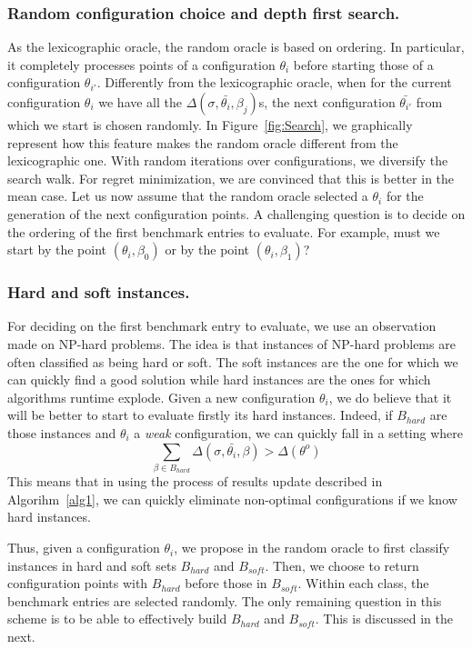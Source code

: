 \documentclass[10pt, conference, compsocconf]{IEEEtran}
\begin{document}
\subsubsection{ Random configuration choice and depth first search.} 
As the lexicographic  oracle, the random  oracle is based on ordering. In particular, it completely processes  
points of a configuration $\theta_{i}$ before starting those of a configuration $\theta_{i'}$.  
Differently from the lexicographic  oracle, when for the current configuration $\theta_i$ 
 we have all the $\Delta(\sigma, \bar{\theta_i}, \beta_j)$s, the next configuration $\bar{\theta_{i'}}$ from 
which we start is chosen randomly. In Figure~\ref{fig:Search}, we graphically represent  how this feature 
makes the random  oracle different from the lexicographic one. With random iterations over configurations, 
we diversify the search walk. For regret minimization, we are convinced that this is better in the mean case. 
Let us now assume that the random  oracle selected a  $\theta_i$ for the generation of the next configuration 
points. A challenging question is to decide on the ordering of the first benchmark entries to evaluate. 
For example, must we start by the point $(\theta_i, \beta_0)$ or by the point $(\theta_i, \beta_1)$?

\subsubsection{ Hard and soft instances.} 

For deciding on the first benchmark entry to evaluate, we use an observation made on NP-hard problems. 
The idea is that instances of NP-hard problems are often classified as being hard or soft. The soft instances are the 
one for which we can quickly find a good solution while hard instances are the ones for which algorithms runtime explode.
Given a new configuration $\theta_i$, we do believe that it will be better to start to evaluate firstly its 
hard instances. Indeed, if $B_{hard}$  are those instances and $\theta_i$ a {\it weak} configuration, 
we can quickly fall in a setting where \[ \sum_{\beta \in B_{hard}} \Delta(\sigma, \bar{\theta_i}, \beta) > \Delta(\theta^o)\]
This means that in using the process of results update described in Algorihm~\ref{alg1}, we can quickly eliminate 
non-optimal configurations if we know hard instances. 

Thus, given a configuration $\theta_i$, we propose in the random  oracle to first classify instances in hard and 
soft sets $B_{hard}$ and $B_{soft}$. Then, we choose  to return configuration points with $B_{hard}$ before 
those in $B_{soft}$. Within each class, the benchmark entries are selected randomly.  
The only remaining question in this scheme  is to be able to effectively build $B_{hard}$ and $B_{soft}$. 
This is discussed in the next.
\end{document}
